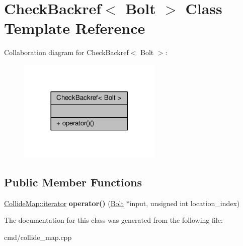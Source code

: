 \hypertarget{classCheckBackref_3_01Bolt_01_4}{}\section{Check\+Backref$<$ Bolt $>$ Class Template Reference}
\label{classCheckBackref_3_01Bolt_01_4}


Collaboration diagram for Check\+Backref$<$ Bolt $>$\+:
\nopagebreak
\begin{figure}[H]
\begin{center}
\leavevmode
\includegraphics[width=194pt]{d9/d5a/classCheckBackref_3_01Bolt_01_4__coll__graph}
\end{center}
\end{figure}
\subsection*{Public Member Functions}
\begin{DoxyCompactItemize}
\item 
\hyperlink{classCollidable}{Collide\+Map\+::iterator} {\bfseries operator()} (\hyperlink{classBolt}{Bolt} $\ast$input, unsigned int location\+\_\+index)\hypertarget{classCheckBackref_3_01Bolt_01_4_ad68d6e60bd291865ea1e7a3a68bc427b}{}\label{classCheckBackref_3_01Bolt_01_4_ad68d6e60bd291865ea1e7a3a68bc427b}

\end{DoxyCompactItemize}


The documentation for this class was generated from the following file\+:\begin{DoxyCompactItemize}
\item 
cmd/collide\+\_\+map.\+cpp\end{DoxyCompactItemize}
